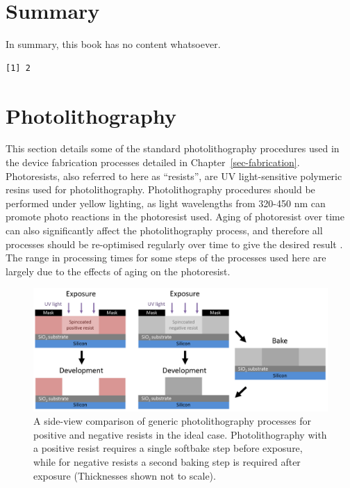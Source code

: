 \documentclass[
  a4paper,
]{scrbook}
\begin{document}

\hypertarget{summary}{%
\chapter{Summary}\label{summary}}

In summary, this book has no content whatsoever.

\begin{verbatim}
[1] 2
\end{verbatim}

\appendix
{}

\hypertarget{sec-photolithography}{%
\chapter{Photolithography}\label{sec-photolithography}}

This section details some of the standard photolithography procedures
used in the device fabrication processes detailed in
Chapter~\ref{sec-fabrication}. Photoresists, also referred to here as
``resists'', are UV light-sensitive polymeric resins used for
photolithography. Photolithography procedures should be performed under
yellow lighting, as light wavelengths from 320-450 nm can promote photo
reactions in the photoresist used. Aging of photoresist over time can
also significantly affect the photolithography process, and therefore
all processes should be re-optimised regularly over time to give the
desired result \autocite{Microchemicals}. The range in processing times
for some steps of the processes used here are largely due to the effects
of aging on the photoresist.

\begin{figure}

{\centering \includegraphics{./figures/app1/positive-negative-photolithography.png}

}

\caption{\label{fig-photolithography-types}A side-view comparison of
generic photolithography processes for positive and negative resists in
the ideal case. Photolithography with a positive resist requires a
single softbake step before exposure, while for negative resists a
second baking step is required after exposure (Thicknesses shown not to
scale).}

\end{figure}
\end{document}
